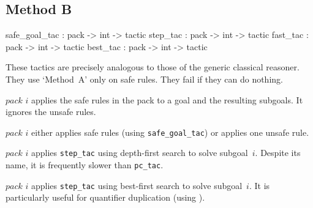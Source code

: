 \subsection{Method B}
\begin{ttbox} 
safe_goal_tac : pack -> int -> tactic
step_tac      : pack -> int -> tactic
fast_tac      : pack -> int -> tactic
best_tac      : pack -> int -> tactic
\end{ttbox}
These tactics are precisely analogous to those of the generic classical
reasoner.  They use `Method~A' only on safe rules.  They fail if they
can do nothing.
\begin{ttdescription}
\item[\ttindexbold{safe_goal_tac} $pack$ $i$] 
applies the safe rules in the pack to a goal and the resulting subgoals.
It ignores the unsafe rules.  

\item[\ttindexbold{step_tac} $pack$ $i$] 
either applies safe rules (using {\tt safe_goal_tac}) or applies one unsafe
rule.

\item[\ttindexbold{fast_tac} $pack$ $i$] 
applies {\tt step_tac} using depth-first search to solve subgoal~$i$.
Despite its name, it is frequently slower than {\tt pc_tac}.

\item[\ttindexbold{best_tac} $pack$ $i$] 
applies {\tt step_tac} using best-first search to solve subgoal~$i$.  It is
particularly useful for quantifier duplication (using ).
\end{ttdescription}



